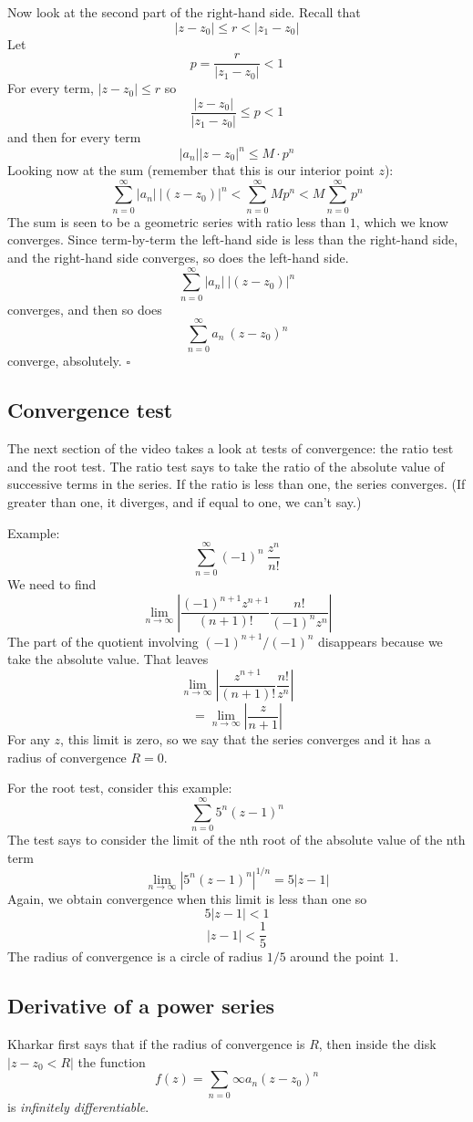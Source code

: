 \documentclass[11pt, oneside]{article}   	%
\begin{document}
Now look at the second part of the right-hand side.  Recall that
\[ |z-z_0| \le r < |z_1-z_0| \]
Let
\[ p = \frac{r}{|z_1 - z_0|} < 1 \]
For every term, $|z - z_0| \le r$
so
\[ \frac{|z - z_0|}{|z_1 - z_0|} \le p < 1 \]
and then for every term
\[ |a_n| |z - z_0|^n \le M \cdot p^n \]
Looking now at the sum (remember that this is our interior point $z$):
\[ \sum_{n=0}^{\infty} |a_n| \ |(z - z_0)|^n < \sum_{n=0}^{\infty} M p^n <  M \sum_{n=0}^{\infty} p^n \]
The sum is seen to be a geometric series with ratio less than $1$, which we know converges.  Since term-by-term the left-hand side is less than the right-hand side, and the right-hand side converges, so does the left-hand side.
\[ \sum_{n=0}^{\infty} |a_n| \ |(z - z_0)|^n \]
converges, and then so does
\[ \sum_{n=0}^{\infty} a_n \ (z - z_0)^n \]
converge, absolutely.
$\square$
\subsection*{Convergence test}
The next section of the video takes a look at tests of convergence:  the ratio test and the root test.  The ratio test says to take the ratio of the absolute value of successive terms in the series.  If the ratio is less than one, the series converges.  (If greater than one, it diverges, and if equal to one, we can't say.)

Example:
\[ \sum_{n=0}^{\infty} (-1)^n \ \frac{z^n}{n!} \]
We need to find
\[ \lim_{n \rightarrow \infty} | \frac{(-1)^{n+1} z^{n+1} }{(n+1)!} \frac{n!}{(-1)^{n} z^{n}} | \]
The part of the quotient involving $(-1)^{n+1}/(-1)^n$ disappears because we take the absolute value.  That leaves
\[ \lim_{n \rightarrow \infty} | \frac{z^{n+1} }{(n+1)!} \frac{n!}{ z^{n}} | \]
\[ = \lim_{n \rightarrow \infty} | \frac{z}{n+1} | \]
For any $z$, this limit is zero, so we say that the series converges and it has a radius of convergence $R = 0$.

For the root test, consider this example:
\[ \sum_{n=0}^{\infty} 5^n (z-1)^n \]
The test says to consider the limit of the nth root of the absolute value of the nth term
\[ \lim_{n \rightarrow \infty} |5^n (z-1)^n |^{1/n} = 5 |z-1| \]
Again, we obtain convergence when this limit is less than one so
\[ 5 |z-1| < 1 \]
\[ |z - 1| < \frac{1}{5} \]
The radius of convergence is a circle of radius $1/5$ around the point $1$.

\subsection*{Derivative of a power series}
Kharkar first says that if the radius of convergence is $R$, then inside the disk $|z - z_0 < R|$ the function
\[ f(z) = \sum_{n = 0}{\infty} a_n (z - z_0)^n \]
is \emph{infinitely differentiable}.
\end{document}
